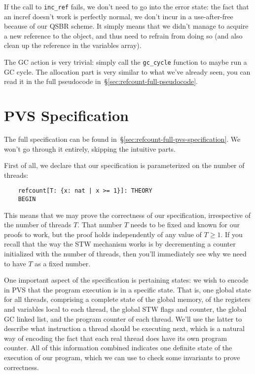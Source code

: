 If the call to \texttt{inc\_ref} fails, we don't need to go into the error state: the fact that an incref doesn't work is perfectly normal, we don't incur in a use-after-free because of our QSBR scheme.
It simply means that we didn't manage to acquire a new reference to the object, and thus need to refrain from doing so (and also clean up the reference in the variables array).

The GC action is very trivial: simply call the \texttt{gc\_cycle} function to maybe run a GC cycle.
The allocation part is very similar to what we've already seen, you can read it in the full pseudocode in~\S\ref{sec:refcount-full-pseudocode}.


\section{PVS Specification}\label{sec:refcount-pvs-specification}

The full specification can be found in~\S\ref{sec:refcount-full-pvs-specification}.
We won't go through it entirely, skipping the intuitive parts.

First of all, we declare that our specification is parameterized on the number of threads:
\begin{verbatim}
	refcount[T: {x: nat | x >= 1}]: THEORY
	BEGIN
\end{verbatim}

This means that we may prove the correctness of our specification, irrespective of the number of threads $T$.
That number $T$ needs to be fixed and known for our proofs to work, but the proof holds independently of any value of $T \geq 1$.
If you recall that the way the STW mechanism works is by decrementing a counter initialized with the number of threads, then you'll immediately see why we need to have $T$ as a fixed number.

One important aspect of the specification is pertaining states: we wish to encode in PVS that the program execution is in a specific state.
That is, one global state for all threads, comprising a complete state of the global memory, of the registers and variables local to each thread, the global STW flags and counter, the global GC linked list, and the program counter of each thread.
We'll use the latter to describe what instruction a thread should be executing next, which is a natural way of encoding the fact that each real thread does have its own program counter.
All of this information combined indicates one definite state of the execution of our program, which we can use to check some invariants to prove correctness.

